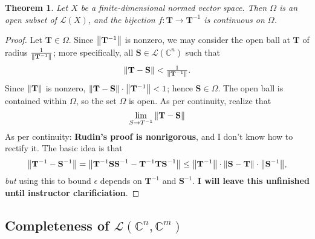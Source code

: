 \documentclass[11pt]{article}
\newcommand{\mat}[1]{\mathbf{#1}}
\newtheorem{theorem}{Theorem}
\begin{document}
\begin{theorem}
	Let $X$ be a finite-dimensional normed vector space. Then $\Omega$ is an open subset of $\mathcal{L}(X)$, and the bijection $f : \mat{T} \to \mat{T}^{-1}$ is continuous on $\Omega$.
\end{theorem}
\begin{adjustwidth}{0.5cm}{}
	\begin{proof}
		Let $\mat{T} \in \Omega$. Since $\norm{\mat{T}^{-1}}$ is nonzero, we may consider the open ball at $\mat{T}$ of radius $\tfrac{1}{\norm{\mat{T}^{-1}}}$; more specifically, all $\mat{S} \in \mathcal{L}(\mathbb{C}^{n})$ such that
		\[
			\norm{\mat{T} - \mat{S}} < \tfrac{1}{\norm{\mat{T}^{-1}}}.
		\]
		Since $\norm{\mat{T}}$ is nonzero, $\norm{\mat{T} - \mat{S}} \cdot \norm{\mat{T}^{-1}} < 1$; hence $\mat{S} \in \Omega$. The open ball is contained within $\Omega$, so the set $\Omega$ is open. As per continuity, realize that
		\[
			\lim\limits_{S \to T^{-1}} \norm{\mat{T} - \mat{S}}
		\]
		As per continuity: \textbf{Rudin's proof is nonrigorous}, and I don't know how to rectify it. The basic idea is that
		\[
			\norm{\mat{T}^{-1} - \mat{S}^{-1}} = \norm{\mat{T}^{-1}\mat{SS}^{-1} - \mat{T}^{-1}\mat{TS}^{-1}} \le \norm{\mat{T}^{-1}} \cdot \norm{\mat{S} - \mat{T}} \cdot \norm{\mat{S}^{-1}},
		\]
		\textit{but} using this to bound $\epsilon$ depends on $\mat{T}^{-1}$ and $\mat{S}^{-1}$. \textbf{I will leave this unfinished until instructor clarificiation}.
	\end{proof}
\end{adjustwidth}


\subsection{Completeness of \texorpdfstring{$\mathcal{L}(\mathbb{C}^{n}, \mathbb{C}^{m})$}{Matricies}}
\end{document}
